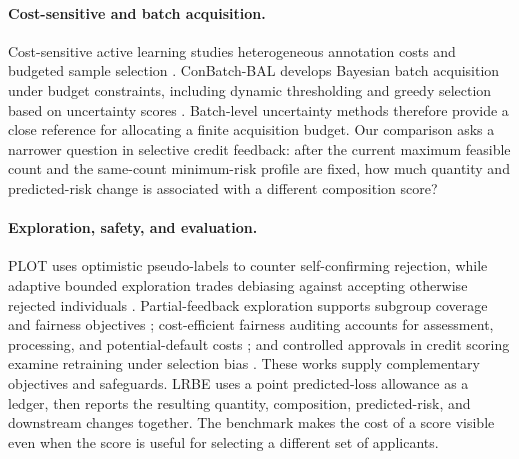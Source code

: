 \paragraph{Cost-sensitive and batch acquisition.}
Cost-sensitive active learning studies heterogeneous annotation costs and budgeted sample selection \cite{donmez2008proactive,tomanek2010cost}. ConBatch-BAL develops Bayesian batch acquisition under budget constraints, including dynamic thresholding and greedy selection based on uncertainty scores \cite{morato2025conbatchbal}. Batch-level uncertainty methods therefore provide a close reference for allocating a finite acquisition budget. Our comparison asks a narrower question in selective credit feedback: after the current maximum feasible count and the same-count minimum-risk profile are fixed, how much quantity and predicted-risk change is associated with a different composition score?

\paragraph{Exploration, safety, and evaluation.}
PLOT uses optimistic pseudo-labels to counter self-confirming rejection, while adaptive bounded exploration trades debiasing against accepting otherwise rejected individuals \cite{pacchiano2021plot,yang2022bounded}. Partial-feedback exploration supports subgroup coverage and fairness objectives \cite{keswani2024partial}; cost-efficient fairness auditing accounts for assessment, processing, and potential-default costs \cite{das2025cost}; and controlled approvals in credit scoring examine retraining under selection bias \cite{scarone2026illusion}. These works supply complementary objectives and safeguards. LRBE uses a point predicted-loss allowance as a ledger, then reports the resulting quantity, composition, predicted-risk, and downstream changes together. The benchmark makes the cost of a score visible even when the score is useful for selecting a different set of applicants.
